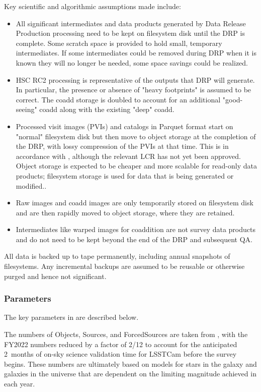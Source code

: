 Key scientific and algorithmic assumptions made include:
\begin{itemize}
\item All significant intermediates and data products generated by Data Release Production processing need to be kept on filesystem disk until the DRP is complete.
Some scratch space is provided to hold small, temporary intermediates.
If some intermediates could be removed during DRP when it is known they will no longer be needed, some space savings could be realized.
\item HSC RC2 processing is representative of the outputs that DRP will generate.
In particular, the presence or absence of "heavy footprints" is assumed to be correct.
The coadd storage is doubled to account for an additional "good-seeing" coadd along with the existing "deep" coadd.
\item Processed visit images (PVIs) and catalogs in Parquet format start on "normal" filesystem disk but then move to object storage at the completion of the DRP, with lossy compression of the PVIs at that time.
This is in accordance with , although the relevant LCR has not yet been approved.
Object storage is expected to be cheaper and more scalable for read-only data products; filesystem storage is used for data that is being generated or modified..
\item Raw images and coadd images are only temporarily stored on filesystem disk and are then rapidly moved to object storage, where they are retained.
\item Intermediates like warped images for coaddition are not survey data products and do not need to be kept beyond the end of the DRP and subsequent QA.
\end{itemize}

All data is backed up to tape permanently, including annual snapshots of filesystems.
Any incremental backups are assumed to be reusable or otherwise purged and hence not significant.

\subsubsection{Parameters}

The key parameters in  are described below.

The numbers of Objects, Sources, and ForcedSources are taken from , with the FY2022 numbers reduced by a factor of 2/12 to account for the anticipated 2~months of on-sky science validation time for LSSTCam before the survey begins.
These numbers are ultimately based on models for stars in the galaxy and galaxies in the universe that are dependent on the limiting magnitude achieved in each year.

